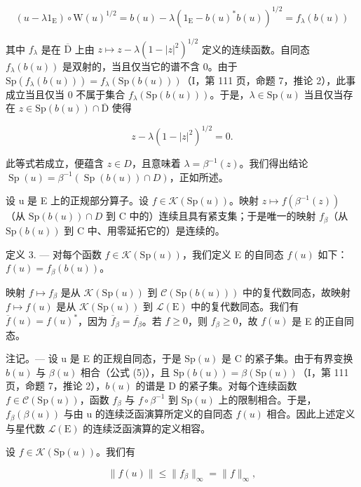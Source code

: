 \[
(u - \lambda 1 _ {\mathrm{E}}) \circ \mathrm{W} (u) ^ {1 / 2} = b (u) - \lambda (1 _ {\mathrm{E}} - b (u) ^ {*} b (u)) ^ {1 / 2} = f _ {\lambda} (b (u))
\]

其中 \(f_{\lambda}\) 是在 \(\overline{\mathrm{D}}\) 上由 \(z \mapsto z - \lambda (1 - |z|^2)^{1/2}\) 定义的连续函数。自同态 \(f_{\lambda}(b(u))\) 是双射的，当且仅当它的谱不含 0。由于 \(\mathrm{Sp}(f_{\lambda}(b(u))) = f_{\lambda}(\mathrm{Sp}(b(u)))\)（I，第 111 页，命题 7，推论 2），此事成立当且仅当 0 不属于集合 \(f_{\lambda}(\mathrm{Sp}(b(u)))\)。于是，\(\lambda \in \mathrm{Sp}(u)\) 当且仅当存在 \(z \in \mathrm{Sp}(b(u)) \cap \overline{\mathrm{D}}\) 使得

\[
z - \lambda (1 - | z | ^ {2}) ^ {1 / 2} = 0.
\]

此等式若成立，便蕴含 \(z \in D\)，且意味着 \(\lambda = \beta^{-1}(z)\)。我们得出结论 \(\operatorname{Sp}(u) = \beta^{-1}(\operatorname{Sp}(b(u)) \cap D)\)，正如所述。

设 u 是 E 上的正规部分算子。设 \(f \in \mathcal{K}(\mathrm{Sp}(u))\)。映射 \(z \mapsto f(\beta^{-1}(z))\)（从 \(\mathrm{Sp}(b(u)) \cap D\) 到 C 中的）连续且具有紧支集；于是唯一的映射 \(f_{\beta}\)（从 \(\mathrm{Sp}(b(u))\) 到 C 中、用零延拓它的）是连续的。

定义 3. --- 对每个函数 \(f \in \mathcal{K}(\mathrm{Sp}(u))\)，我们定义 E 的自同态 \(f(u)\) 如下：\(f(u) = f_{\beta}(b(u))\)。

映射 \(f \mapsto f_{\beta}\) 是从 \(\mathcal{K}(\mathrm{Sp}(u))\) 到 \(\mathcal{C}(\mathrm{Sp}(b(u)))\) 中的复代数同态，故映射 \(f \mapsto f(u)\) 是从 \(\mathcal{K}(\mathrm{Sp}(u))\) 到 \(\mathcal{L}(\mathrm{E})\) 中的复代数同态。我们有 \(\overline{f}(u) = f(u)^*\)，因为 \(\overline{f}_{\beta} = \overline{f_{\beta}}\)。若 \(f \geqslant 0\)，则 \(f_{\beta} \geqslant 0\)，故 \(f(u)\) 是 E 的正自同态。

注记。--- 设 u 是 E 的正规自同态，于是 \(\mathrm{Sp}(u)\) 是 C 的紧子集。由于有界变换 \(b(u)\) 与 \(\beta(u)\) 相合（公式 (5)），且 \(\mathrm{Sp}(b(u)) = \beta(\mathrm{Sp}(u))\)（I，第 111 页，命题 7，推论 2），\(b(u)\) 的谱是 D 的紧子集。对每个连续函数 \(f \in \mathcal{C}(\mathrm{Sp}(u))\)，函数 \(f_{\beta}\) 与 \(f \circ \beta^{-1}\) 到 \(\mathrm{Sp}(u)\) 上的限制相合。于是，\(f_{\beta}(\beta(u))\) 与由 u 的连续泛函演算所定义的自同态 \(f(u)\) 相合。因此上述定义与星代数 \(\mathcal{L}(\mathrm{E})\) 的连续泛函演算的定义相容。

设 \(f\in \mathcal{K}(\mathrm{Sp}(u))\)。我们有

\[
\| f (u) \| \leqslant \| f _ {\beta} \| _ {\infty} = \| f \| _ {\infty},
\]

